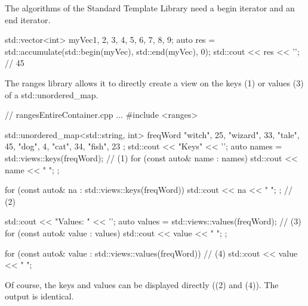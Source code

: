 The algorithms of the Standard Template Library need a begin iterator and an end iterator.

\begin{cpp}
std::vector<int> myVec{1, 2, 3, 4, 5, 6, 7, 8, 9};
auto res = std::accumulate(std::begin(myVec), std::end(myVec), 0);
std::cout << res << '\n'; // 45
\end{cpp}

The ranges library allows it to directly create a view on the keys (1) or values (3) of a std::unordered\_map.


\begin{cpp}
// rangesEntireContainer.cpp
...
#include <ranges>

std::unordered_map<std::string, int> freqWord{ {"witch", 25}, {"wizard", 33},
											   {"tale", 45}, {"dog", 4},
											   {"cat", 34}, {"fish", 23} };
std::cout << "Keys" << '\n';
auto names = std::views::keys(freqWord); // (1)
for (const auto& name : names){ std::cout << name << " "; };

for (const auto& na : std::views::keys(freqWord)){ std::cout << na << " "; }; // (2)

std::cout << "Values: " << '\n';
auto values = std::views::values(freqWord); // (3)
for (const auto& value : values){ std::cout << value << " "; };

for (const auto& value : std::views::values(freqWord)){ // (4)
	std::cout << value << " ";
}
\end{cpp}

Of course, the keys and values can be displayed directly ((2) and (4)). The output is identical.



























